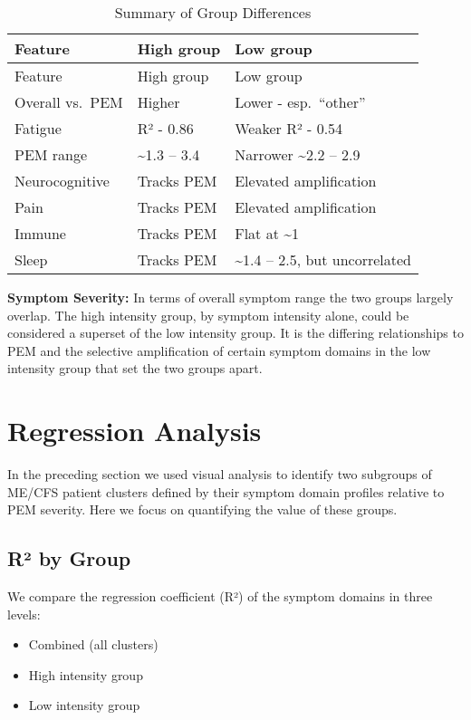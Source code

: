 \documentclass[
  letterpaper,
  DIV=11,
  numbers=noendperiod]{scrartcl}
\providecommand{\tightlist}{%
  \setlength{\itemsep}{0pt}\setlength{\parskip}{0pt}}
\begin{document}
\begin{longtable}[]{@{}lll@{}}
\caption{Summary of Group Differences}\label{tbl-t1}\tabularnewline
\toprule\noalign{}
Feature & High group & Low group \\
\midrule\noalign{}
\endfirsthead
\toprule\noalign{}
Feature & High group & Low group \\
\midrule\noalign{}
\endhead
\bottomrule\noalign{}
\endlastfoot
Overall vs.~PEM & Higher & Lower - esp.~``other'' \\
Fatigue & R² - 0.86 & Weaker R² - 0.54 \\
PEM range & \textasciitilde1.3 -- 3.4 & Narrower \textasciitilde2.2 --
2.9 \\
Neurocognitive & Tracks PEM & Elevated amplification \\
Pain & Tracks PEM & Elevated amplification \\
Immune & Tracks PEM & Flat at \textasciitilde1 \\
Sleep & Tracks PEM & \textasciitilde1.4 -- 2.5, but uncorrelated \\
\end{longtable}

\bigskip

\textbf{Symptom Severity:} In terms of overall symptom range the two
groups largely overlap. The high intensity group, by symptom intensity
alone, could be considered a superset of the low intensity group. It is
the differing relationships to PEM and the selective amplification of
certain symptom domains in the low intensity group that set the two
groups apart.

\section{Regression Analysis}\label{regression-analysis}

In the preceding section we used visual analysis to identify two
subgroups of ME/CFS patient clusters defined by their symptom domain
profiles relative to PEM severity. Here we focus on quantifying the
value of these groups.

\subsection{R² by Group}\label{ruxb2-by-group}

We compare the regression coefficient (R²) of the symptom domains in
three levels:

\begin{itemize}
\tightlist
\item
  Combined (all clusters)
\item
  High intensity group
\item
  Low intensity group
\end{itemize}
\end{document}
